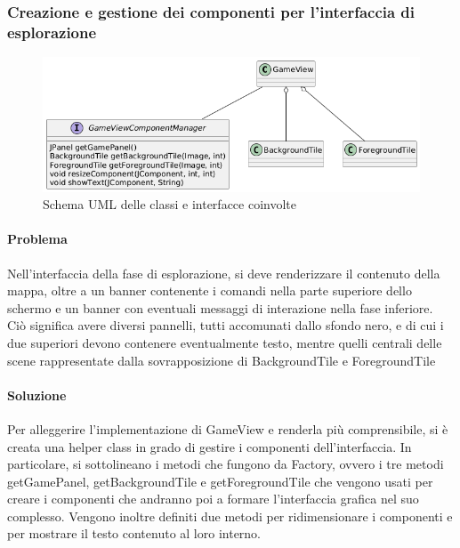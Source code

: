 \documentclass[a4paper,12pt]{report}
\begin{document}
\subsubsection{Creazione e gestione dei componenti per l'interfaccia di esplorazione}
\begin{figure}[H]
	\centering
	\includegraphics[width=\textwidth]{img/factory-gameview.png}
	\caption{Schema UML delle classi e interfacce coinvolte}
	\label{img:factory-gameview.png}
\end{figure}
\paragraph{Problema} Nell'interfaccia della fase di esplorazione, si deve renderizzare il contenuto della mappa, oltre a un banner contenente i comandi nella parte superiore dello schermo e un banner con eventuali messaggi di interazione nella fase inferiore. Ciò significa avere diversi pannelli, tutti accomunati dallo sfondo nero, e di cui i due superiori devono contenere eventualmente testo, mentre quelli centrali delle scene rappresentate dalla sovrapposizione di BackgroundTile e ForegroundTile
\paragraph{Soluzione} Per alleggerire l'implementazione di GameView e renderla più comprensibile, si è creata una helper class in grado di gestire i componenti dell'interfaccia. In particolare, si sottolineano i metodi che fungono da Factory, ovvero i tre metodi getGamePanel, getBackgroundTile e getForegroundTile che vengono usati per creare i componenti che andranno poi a formare l'interfaccia grafica nel suo complesso. Vengono inoltre definiti due metodi per ridimensionare i componenti e per mostrare il testo contenuto al loro interno.
\end{document}
